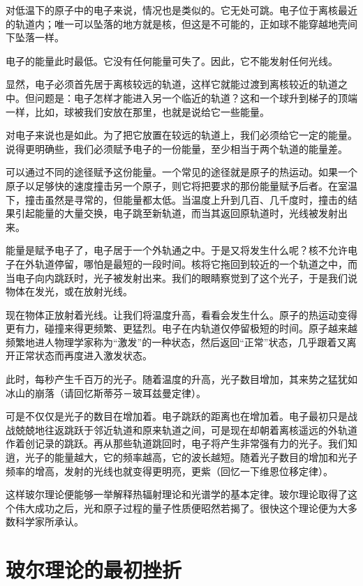 对低温下的原子中的电子来说，情况也是类似的。它无处可跳。电子位于离核最近的轨道内；唯一可以坠落的地方就是核，但这是不可能的，正如球不能穿越地壳间下坠落一样。

电子的能量此时最低。它没有任何能量可失了。因此，它不能发射任何光线。

显然，电子必须首先居于离核较远的轨道，这样它就能过渡到离核较近的轨道之中。但问题是：电子怎样才能进入另一个临近的轨道？这和一个球升到梯子的顶端一样，比如，球被我们安放在那里，也就是说给它一些能量。

对电子来说也是如此。为了把它放置在较远的轨道上，我们必须给它一定的能量。说得更明确些，我们必须赋予电子的一份能量，至少相当于两个轨道的能量差。

可以通过不同的途径赋予这份能量。一个常见的途径就是原子的热运动。如果一个原子以足够快的速度撞击另一个原子，则它将把要求的那份能量赋予后者。在室温下，撞击虽然是寻常的，但能量都太低。当温度上升到几百、几千度时，撞击的结果引起能量的大量交换，电子跳至新轨道，而当其返回原轨道时，光线被发射出来。

能量是赋予电子了，电子居于一个外轨通之中。于是又将发生什么呢？核不允许电子在外轨道停留，哪怕是最短的一段时间。核将它拖回到较近的一个轨道之中，而当电子向内跳跃时，光子被发射出来。我们的眼睛察觉到了这个光子，于是我们说物体在发光，或在放射光线。

现在物体正放射着光线。让我们将温度升高，看看会发生什么。原子的热运动变得更有力，碰撞来得更频繁、更猛烈。电子在内轨道仅停留极短的时间。原子越来越频繁地进人物理学家称为“激发”的一种状态，然后返回“正常”状态，几乎跟着又离开正常状态而再度进入激发状态。

此时，每秒产生千百万的光子。随着温度的升高，光子数目增加，其来势之猛犹如冰山的崩落（请回忆斯蒂芬－玻耳兹曼定律）。

可是不仅仅是光子的数目在增加着。电子跳跃的距离也在增加着。电子最初只是战战兢兢地往返跳跃于邻近轨道和原来轨道之间，可是现在却朝着离核遥远的外轨道作着创记录的跳跃。再从那些轨道跳回时，电子将产生非常强有力的光子。我们知逍，光子的能量越大，它的频率越高，它的波长越短。随着光子数目的增加和光子频率的增高，发射的光线也就变得更明亮，更紫（回忆一下维恩位移定律）。

这样玻尔理论便能够一举解释热辐射理论和光谱学的基本定律。玻尔理论取得了这个伟大成功之后，光和原子过程的量子性质便昭然若揭了。很快这个理论便为大多数科学家所承认。

\section{玻尔理论的最初挫折}

